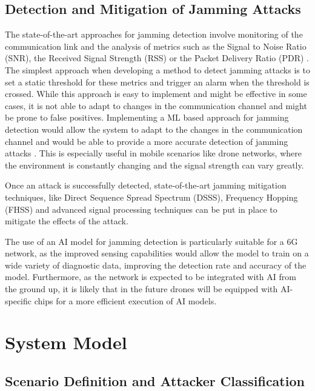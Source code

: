 \documentclass[futureinternet,article,submit,pdftex,moreauthors]{Definitions/mdpi}
\begin{document}
\subsection{Detection and Mitigation of Jamming Attacks}\label{sec:DetectionMitigation}

The state-of-the-art approaches for jamming detection involve monitoring of the communication link and the analysis of metrics such as the Signal to Noise Ratio (SNR), the Received Signal Strength (RSS) or the Packet Delivery Ratio (PDR) \cite{JammingDetection-Sciancalepore}. The simplest approach when 
developing a method to detect jamming attacks is to set a static threshold for these metrics and trigger an alarm when the threshold is crossed. While this approach is easy to implement and might be effective in some cases, it is not able to adapt to changes in the communication channel and might be prone to false positives.
Implementing a ML based approach for jamming detection would allow the system to adapt to the changes in the communication channel and would be able to provide a more accurate detection of jamming attacks \cite{VANETsAI-Lyamin}. This is especially useful in mobile scenarios like 
drone networks, where the environment is constantly changing and the signal strength can vary greatly. 

Once an attack is successfully detected, state-of-the-art jamming mitigation techniques, like Direct Sequence Spread Spectrum (DSSS), Frequency Hopping (FHSS) and advanced signal processing techniques can be put in place to mitigate the 
effects of the attack. 

The use of an AI model for jamming detection is particularly suitable for a 6G network, as the improved sensing capabilities would allow the model to train on a wide variety of diagnostic data, improving the detection rate and accuracy of the model. 
Furthermore, as the network is expected to be integrated with AI from the ground up, it is likely that in the future drones will be equipped with AI-specific chips for a more efficient execution of AI models.

\section{System Model}

\subsection{Scenario Definition and Attacker Classification}
\end{document}
